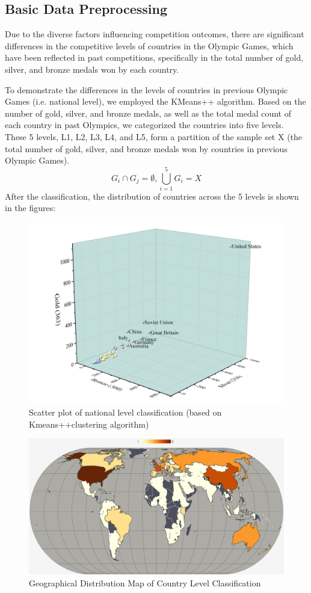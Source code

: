 \documentclass[12pt]{article}  %
\begin{document}
\subsection{Basic Data Preprocessing}
Due to the diverse factors influencing competition outcomes, there are significant differences in the competitive levels of countries in the Olympic Games, which have been reflected in past competitions, specifically in the total number of gold, silver, and bronze medals won by each country. 

To demonstrate the differences in the levels of countries in previous Olympic Games (i.e. national level), we employed the KMeans++ algorithm. Based on the number of gold, silver, and bronze medals, as well as the total medal count of each country in past Olympics, we categorized the countries into five levels. These 5 levels, L1, L2, L3, L4, and L5, form a partition of the sample set X (the total number of gold, silver, and bronze medals won by countries in previous Olympic Games).
\begin{equation}
G_{i} \cap G_{j}=\emptyset, \bigcup_{i=1}^{5} G_{i}=X
\end{equation}
After the classification, the distribution of countries across the 5 levels is shown in the figures:
\begin{figure}[htbp]
	\centering
	\includegraphics[width=12cm]{img/Level1.png}
	\caption{Scatter plot of national level classification (based on Kmeans++clustering algorithm)}
	\label{fig:aa}
\end{figure}

\begin{figure}[htbp]
	\centering
	\includegraphics[width=12cm]{img/Level2.png}
	\caption{Geographical Distribution Map of Country Level Classification}
	\label{fig:aa}
\end{figure}
\end{document}
